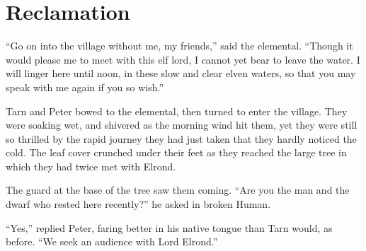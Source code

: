 \chapter{Reclamation}
``Go on into the village without me, my friends,'' said the elemental.  ``Though it would please me to meet with this elf lord, I cannot yet bear to leave the water.  I will linger here until noon, in these slow and clear elven waters, so that you may speak with me again if you so wish.''

Tarn and Peter bowed to the elemental, then turned to enter the village.   They were soaking wet, and shivered as the morning wind hit them, yet they were still so thrilled by the rapid journey they had just taken that they hardly noticed the cold.  The leaf cover crunched under their feet as they reached the large tree in which they had twice met with Elrond.

The guard at the base of the tree saw them coming.  ``Are you the man and the dwarf who rested here recently?'' he asked in broken Human.

``Yes,'' replied Peter, faring better in his native tongue than Tarn would, as before.  ``We seek an audience with Lord Elrond.''